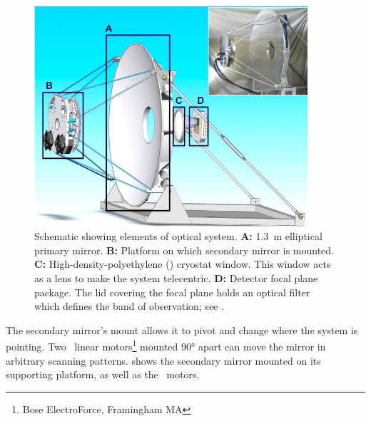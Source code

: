 \begin{figure}
\centering
\includegraphics[width=4in]{images/optics-labeled-fixed.jpg}
\caption[Schematic showing elements of optical system]{
Schematic showing elements of optical system.
\textbf{A:} \SI{1.3}{\m} elliptical primary mirror.
\textbf{B:} Platform on which secondary mirror is mounted.
\textbf{C:} High-density-polyethylene (\HDPE) cryostat window.
           This window acts as a lens to make the system telecentric.
\textbf{D:} Detector focal plane package.
           The lid covering the focal plane holds an optical filter which defines the band of observation; see .
}
\label{fig:ch4-optical-schematic}
\end{figure}

The secondary mirror's mount allows it to pivot and change where the system is pointing.
Two \BOSE\ linear motors\footnote{Bose ElectroForce, Framingham MA} mounted \ang{90} apart can move the mirror in arbitrary scanning patterns.
 shows the secondary mirror mounted on its supporting platform, as well as the \BOSE\ motors.


